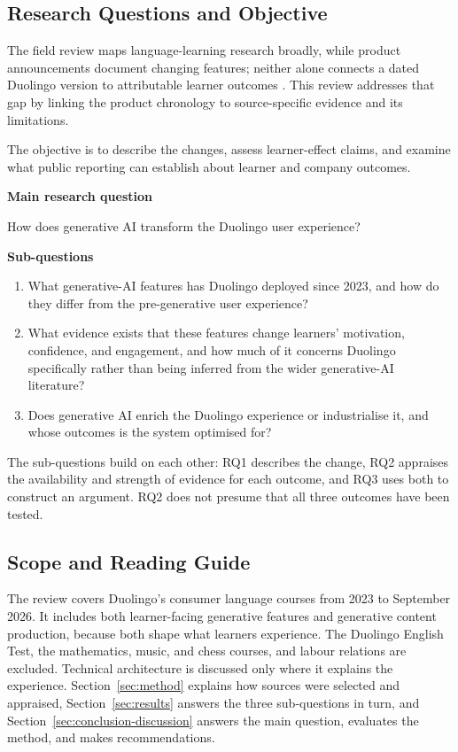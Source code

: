 \documentclass[11pt,titlepage]{article}
\begin{document}
\subsection{Research Questions and Objective}
The field review maps language-learning research broadly, while product announcements document changing features; neither alone connects a dated Duolingo version to attributable learner outcomes \parencite{liReview2025,maxLaunch,duocon2024}. This review addresses that gap by linking the product chronology to source-specific evidence and its limitations.

The objective is to describe the changes, assess learner-effect claims, and examine what public reporting can establish about learner and company outcomes.

\noindent\textbf{Main research question}

How does generative AI transform the Duolingo user experience?

\noindent\textbf{Sub-questions}
\begin{enumerate}
    \item What generative-AI features has Duolingo deployed since 2023, and how do they differ from the pre-generative user experience?
    \item What evidence exists that these features change learners' motivation, confidence, and engagement, and how much of it concerns Duolingo specifically rather than being inferred from the wider generative-AI literature?
    \item Does generative AI enrich the Duolingo experience or industrialise it, and whose outcomes is the system optimised for?
\end{enumerate}

The sub-questions build on each other: RQ1 describes the change, RQ2 appraises the availability and strength of evidence for each outcome, and RQ3 uses both to construct an argument. RQ2 does not presume that all three outcomes have been tested.

\subsection{Scope and Reading Guide}
The review covers Duolingo's consumer language courses from 2023 to September 2026. It includes both learner-facing generative features and generative content production, because both shape what learners experience. The Duolingo English Test, the mathematics, music, and chess courses, and labour relations are excluded. Technical architecture is discussed only where it explains the experience. Section~\ref{sec:method} explains how sources were selected and appraised, Section~\ref{sec:results} answers the three sub-questions in turn, and Section~\ref{sec:conclusion-discussion} answers the main question, evaluates the method, and makes recommendations.
\end{document}
